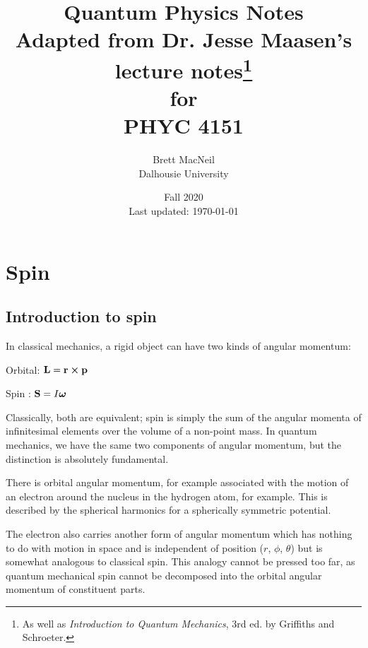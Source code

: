 \documentclass[12pt, titlepage]{article}
\begin{document}
\title{\huge Quantum Physics Notes \vspace{2cm} \\  \large Adapted from Dr. Jesse Maasen's lecture notes\thanks{As well as \emph{Introduction to Quantum Mechanics}, 3rd ed. by Griffiths and Schroeter.} \\ \vspace{0.5cm} \normalsize for \vspace{0.5cm} \\  PHYC 4151 \vspace{2cm}}
\author{\huge Brett MacNeil \\ \vspace{0.5cm} \normalsize Dalhousie University}
\date{Fall 2020 \\ \vspace{1cm}
	\normalsize Last updated: \today}
\maketitle

\section{Spin}
\subsection{Introduction to spin}
In classical mechanics, a rigid object can have two kinds of angular momentum:

\begin{description}
	\item Orbital: $\vb{L} = \vb{r}\cross\vb{p}$
	\item Spin : $\vb{S} = I\vb*{\omega}$
\end{description}


Classically, both are equivalent; spin is simply the sum of the angular momenta of infinitesimal elements over the volume of a non-point mass. In quantum mechanics, we have the same two components of angular momentum, but the distinction is absolutely fundamental.

There is orbital angular momentum, for example associated with the motion of an electron around the nucleus in the hydrogen atom, for example. This is described by the spherical harmonics for a spherically symmetric potential.

The electron also carries another form of angular momentum which has nothing to do with motion in space and is independent of position ($r$, $\phi$, $\theta$) but is somewhat analogous to classical spin. This analogy cannot be pressed too far, as quantum mechanical spin cannot be decomposed into the orbital angular momentum of constituent parts.
\end{document}
